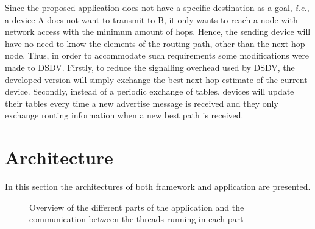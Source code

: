 Since the proposed application does not have a specific destination as a goal, \textit{i.e.}, a device A does not want to transmit to B, it only wants to reach a node with network access with the minimum amount of hops. Hence, the sending device will have no need to know the elements of the routing path, other than the next hop node. Thus, in order to accommodate such requirements some modifications were made to \gls{DSDV}. Firstly, to reduce the signalling overhead used by \gls{DSDV}, the developed version will simply exchange the best next hop estimate of the current device. Secondly, instead of a periodic exchange of tables, devices will update their tables every time a new advertise message is received and they only exchange routing information when a new best path is received.

\section{Architecture}
\label{sec:architecture}

In this section the architectures of both framework and application are presented.

\begin{figure}[ht]
	\noindent{}
	\caption{\label{fig:appsandbox} Overview of the different parts of the application and the communication between the threads running in each part}
\end{figure}

